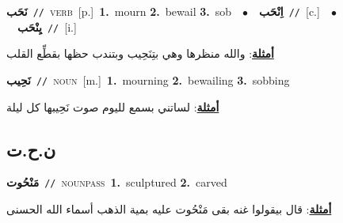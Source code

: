 \documentclass[10pt,a4paper,twoside]{article} %
\begin{document}
\begin{multicols}{2}
{\setlength\topsep{0pt}\textbf{\foreignlanguage{arabic}{نَحَب}}\ {\color{gray}\texttt{//}\color{black}}\ \textsc{verb}\ [p.]\ \textbf{1.}~mourn  \textbf{2.}~bewail  \textbf{3.}~sob\ \ $\bullet$\ \ \setlength\topsep{0pt}\textbf{\foreignlanguage{arabic}{اِنْحَب}}\ {\color{gray}\texttt{//}\color{black}}\ [c.]\ \ $\bullet$\ \ \setlength\topsep{0pt}\textbf{\foreignlanguage{arabic}{يِنْحَب}}\ {\color{gray}\texttt{//}\color{black}}\ [i.]\  \begin{flushright}\color{gray}\foreignlanguage{arabic}{\textbf{\underline{\foreignlanguage{arabic}{أمثلة}}}: والله منظرها وهي بتِنَحِيب وبتندب حظها بقطِّع القلب}\end{flushright}\color{black}} \vspace{2mm}

{\setlength\topsep{0pt}\textbf{\foreignlanguage{arabic}{نَحِيب}}\ {\color{gray}\texttt{//}\color{black}}\ \textsc{noun}\ [m.]\ \textbf{1.}~mourning  \textbf{2.}~bewailing  \textbf{3.}~sobbing\  \begin{flushright}\color{gray}\foreignlanguage{arabic}{\textbf{\underline{\foreignlanguage{arabic}{أمثلة}}}: لساتني بسمع لليوم صوت نَحِيبها كل ليلة}\end{flushright}\color{black}} \vspace{2mm}

\vspace{-3mm}
\subsection*{\color{blue}\foreignlanguage{arabic}{ن.ح.ت}\color{blue}{}} 

{\setlength\topsep{0pt}\textbf{\foreignlanguage{arabic}{مَنْحُوت}}\ {\color{gray}\texttt{//}\color{black}}\ \textsc{noun\textunderscore pass}\ \textbf{1.}~sculptured  \textbf{2.}~carved\  \begin{flushright}\color{gray}\foreignlanguage{arabic}{\textbf{\underline{\foreignlanguage{arabic}{أمثلة}}}: قال بيقولوا غنه بقى مَنْحُوت عليه بمية الذهب أسماء الله الحسنى}\end{flushright}\color{black}} \vspace{2mm}


\end{multicols}
\end{document}
